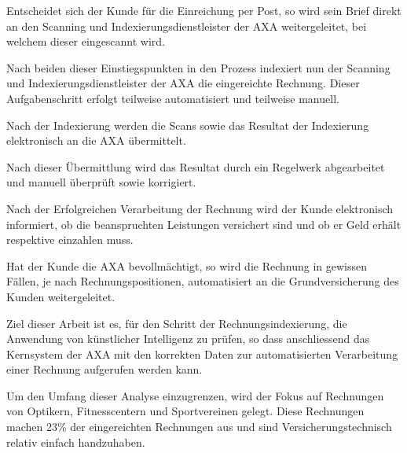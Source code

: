 Entscheidet sich der Kunde für die Einreichung per Post, so wird sein Brief direkt an den Scanning und Indexierungsdienstleister der AXA weitergeleitet, bei welchem dieser eingescannt wird.

Nach beiden dieser Einstiegspunkten in den Prozess indexiert nun der Scanning und Indexierungsdienstleister der AXA die eingereichte Rechnung. Dieser Aufgabenschritt erfolgt teilweise automatisiert und teilweise manuell.

Nach der Indexierung werden die Scans sowie das Resultat der Indexierung elektronisch an die AXA übermittelt. 

Nach dieser Übermittlung wird das Resultat durch ein Regelwerk abgearbeitet und manuell überprüft sowie korrigiert.

Nach der Erfolgreichen Verarbeitung der Rechnung wird der Kunde elektronisch informiert, ob die beanspruchten Leistungen versichert sind und ob er Geld erhält respektive einzahlen muss.

Hat der Kunde die AXA bevollmächtigt, so wird die Rechnung in gewissen Fällen, je nach Rechnungspositionen, automatisiert an die Grundversicherung des Kunden weitergeleitet. 

Ziel dieser Arbeit ist es, für den Schritt der Rechnungsindexierung, die Anwendung von künstlicher Intelligenz zu prüfen, so dass anschliessend das Kernsystem der AXA mit den korrekten Daten zur automatisierten Verarbeitung einer Rechnung aufgerufen werden kann.

Um den Umfang dieser Analyse einzugrenzen, wird der Fokus auf Rechnungen von Optikern, Fitnesscentern und Sportvereinen gelegt. Diese Rechnungen machen 23\% der eingereichten Rechnungen aus und sind Versicherungstechnisch relativ einfach handzuhaben.


